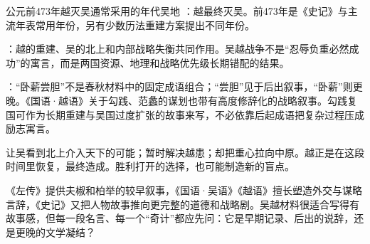 \begin{event}{公元前473年}{越灭吴}{通常采用的年代}{吴地}
：越最终灭吴。前473年是《史记》与主流年表常用年份，另有少数历法重建方案提出不同年份。

：越的重建、吴的北上和内部战略失衡共同作用。吴越战争不是“忍辱负重必然成功”的寓言，而是两国资源、地理和战略优先级长期错配的结果。

：“卧薪尝胆”不是春秋材料中的固定成语组合；“尝胆”见于后出叙事，“卧薪”则更晚。《国语·越语》关于勾践、范蠡的谋划也带有高度修辞化的战略叙事。勾践复国可作为长期重建与吴国过度扩张的故事来写，不必依靠后起成语把复杂过程压成励志寓言。
\end{event}

\begin{causalchain}[从攻入郢都到越灭吴]
让吴看到北上介入天下的可能；暂时解决越患；却把重心拉向中原。越正是在这段时间里恢复，最终造成。胜利打开的选择，也可能制造新的盲点。
\end{causalchain}

\begin{sourcenote}[吴越故事为何特别容易被后人改写]
《左传》提供夫椒和柏举的较早叙事，《国语·吴语》《越语》擅长塑造外交与谋略言辞，《史记》又把人物故事推向更完整的道德和战略剧。吴越材料很适合写得有故事感，但每一段名言、每一个“奇计”都应先问：它是早期记录、后出的说辞，还是更晚的文学凝结？
\end{sourcenote}


